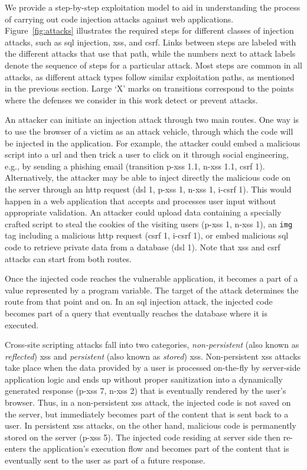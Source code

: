 \documentclass[conference]{IEEEtran}
\begin{document}
We provide a step-by-step exploitation model to aid in understanding the process
of carrying out code injection attacks against web
applications. Figure~\ref{fig:attacks} illustrates the required steps for
different classes of injection attacks,
such as {\sc sql} injection, {\sc xss}, and {\sc csrf}. Links between steps are
labeled with the different attacks that use that path, while the
numbers next to attack labels denote the sequence of steps for a
particular attack. Most steps are common in all attacks, as different attack
types follow similar exploitation paths, as mentioned in
the previous section. Large `X' marks on transitions correspond to the
points where the defenses we consider in this work detect or prevent attacks.

An attacker can initiate an injection attack through two main routes.
One way is to use the browser of a victim as an attack
vehicle, through which the code will be injected in the application.
For example, the attacker could embed a malicious script into a {\sc
  url} and then trick a user to click on it through social
engineering, e.g., by sending a phishing email (transition {\sc p-xss} 1.1, {\sc
  n-xss} 1.1, {\sc csrf} 1). Alternatively, the attacker may be able
to inject directly the malicious code on the server through an {\sc http} request
({\sc dsl} 1, {\sc p-xss} 1, {\sc n-xss} 1, {\sc i-csrf} 1). This would happen
in a web application that accepts and processes user input
without appropriate validation. An attacker could upload data
containing a specially crafted script
to steal the cookies of the visiting users ({\sc p-xss} 1, {\sc n-xss} 1),
an {\tt img} tag including a malicious {\sc http} request ({\sc csrf 1}, {\sc
i-csrf 1}),
or embed malicious
{\sc sql} code to retrieve private data from a database ({\sc dsl} 1).
Note that {\sc xss} and {\sc csrf} attacks can start from both routes.

Once the injected code reaches the vulnerable application, it becomes
a part of a value represented by a program variable. The target of the
attack determines the route from that point and on. In an {\sc sql} injection
attack, the injected code becomes part of a query that
eventually reaches the database where it is executed.

Cross-site scripting attacks fall into two categories, {\it non-persistent}
(also known as \emph{reflected}) {\sc xss}
and {\it persistent} (also known as \emph{stored}) {\sc xss}.
Non-persistent {\sc xss} attacks take place when the
data provided by a user is processed on-the-fly
by server-side application logic and ends up without proper sanitization
into a dynamically generated response ({\sc p-xss} 7, {\sc n-xss} 2)
that is eventually rendered by the user's browser.
Thus, in a non-persistent {\sc xss} attack, the injected code
is not saved on the server, but immediately becomes part of the
content that is sent back to a user.
In persistent {\sc xss} attacks, on the other hand,
malicious code is permanently stored on the server ({\sc p-xss} 5).
The injected code residing at server side then re-enters the
application's execution flow and becomes part of the content that is
eventually sent to the user as part of a future response.
\end{document}
